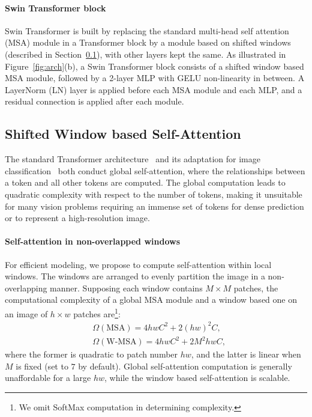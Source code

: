 \documentclass[10pt,twocolumn,letterpaper]{article}
\begin{document}
\paragraph{Swin Transformer block} Swin Transformer is built by replacing the standard multi-head self attention (MSA) module in a Transformer block by a module based on shifted windows (described in Section~\ref{sec:shifted}), with other layers kept the same. As illustrated in Figure~\ref{fig:arch}(b), a Swin Transformer block consists of a shifted window based MSA module, followed by a 2-layer MLP with GELU non-linearity in between. A LayerNorm (LN) layer is applied before each MSA module and each MLP, and a residual connection is applied after each module.

\subsection{Shifted Window based Self-Attention}
\label{sec:shifted}

The standard Transformer architecture~\cite{vaswani2017attention} and its adaptation for image classification~\cite{dosovitskiy2020vit} both conduct global self-attention, where the relationships between a token and all other tokens are computed. The global computation leads to quadratic complexity with respect to the number of tokens, making it unsuitable for many vision problems requiring an immense set of tokens for dense prediction or to represent a high-resolution image.

\paragraph{Self-attention in non-overlapped windows}
For efficient modeling, we propose to compute self-attention within local windows. The windows are arranged to evenly partition the image in a non-overlapping manner. Supposing each window contains $M\times M$ patches, the computational complexity of a global MSA module and a window based one on an image of $h\times w$ patches are\footnote{We omit SoftMax computation in determining complexity.}:
\begin{align}
&\Omega (\text{MSA}) = 4hwC^2 + 2 (hw)^2C, \\
&\Omega (\text{W-MSA}) = 4hwC^2 + 2 M^2 hwC,
\end{align}
where the former is quadratic to patch number $hw$, and the latter is linear when $M$ is fixed (set to $7$ by default). Global self-attention computation is generally unaffordable for a large $hw$, while the window based self-attention is scalable.
\end{document}
